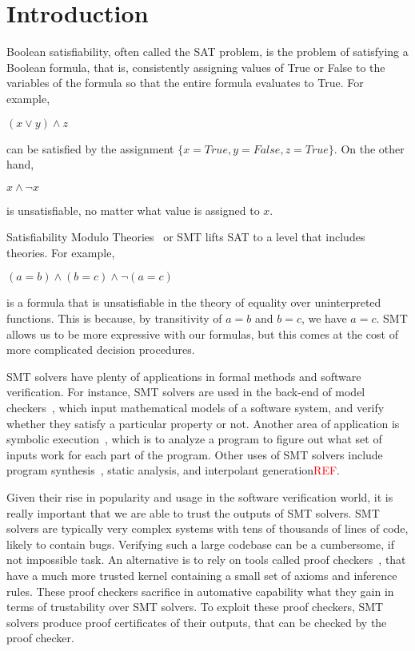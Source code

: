 \documentclass{article}
\begin{document}
\section{Introduction}
\label{sec:intro}
Boolean satisfiability, often called the SAT problem, 
is the problem of satisfying a Boolean formula, that is, 
consistently assigning values of True or False to the variables 
of the formula so that the entire formula evaluates to True. 
For example,
\begin{center}$(x \lor y) \land z$ \end{center}
can be satisfied by the 
assignment $\{x=True,y=False,z=True\}$. On the other hand, 
\begin{center} $x \land \neg x$ \end{center}
is unsatisfiable, no matter what value is assigned to $x$.

Satisfiability Modulo Theories~\cite{DBLP:reference/mc/BarrettT18} 
or SMT lifts SAT to a level that includes theories. 
For example, 
\begin{center} $(a = b) \land (b = c) \land \neg (a = c)$ 
\end{center}
is a formula that is unsatisfiable in the theory of 
equality over uninterpreted functions. This is because, by
transitivity of $a = b$ and $b = c$, we have $a = c$. SMT 
allows us to be more expressive with our formulas, but 
this comes at the cost of more complicated decision 
procedures.

SMT solvers have plenty of applications in formal methods 
and software verification. For instance, SMT solvers are used 
in the back-end of model checkers~\cite{DBLP:books/daglib/0020348}, 
which input mathematical 
models of a software system, and verify whether they 
satisfy a particular property or not. Another area of 
application is symbolic
execution~\cite{DBLP:journals/csur/BaldoniCDDF18}, 
which is to analyze a 
program to figure out what set of inputs work for each 
part of the program. Other uses of SMT solvers include 
program synthesis~\cite{synth}, static analysis, 
and interpolant generation\textcolor{red}{REF}.

Given their rise in popularity and usage in the software 
verification world, it is really important that we are able 
to trust the outputs of SMT solvers. SMT solvers are typically 
very complex systems with tens of thousands of lines of code, 
likely to contain bugs. Verifying such a large codebase can 
be a cumbersome, if not impossible task. An alternative is 
to rely on tools called proof checkers~\cite{proofasst}, 
that have a much more trusted kernel containing a small 
set of axioms and inference rules. These proof checkers 
sacrifice in automative capability what they gain in terms 
of trustability over SMT solvers. To exploit these proof 
checkers, SMT solvers produce proof certificates of their 
outputs, that can be checked by the proof checker.
\end{document}

